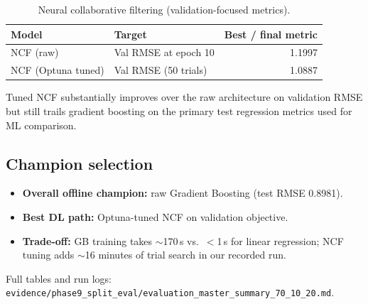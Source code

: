 \begin{table}[ht]
  \centering
  \caption{Neural collaborative filtering (validation-focused metrics).}
  \label{tab:dl}
  \begin{tabular}{llr}
    \toprule
    Model & Target & Best / final metric \\
    \midrule
    NCF (raw)         & Val RMSE at epoch 10 & 1.1997 \\
    NCF (Optuna tuned)& Val RMSE (50 trials)  & 1.0887 \\
    \bottomrule
  \end{tabular}
\end{table}

Tuned NCF substantially improves over the raw architecture on validation RMSE but still trails gradient
boosting on the primary test regression metrics used for ML comparison.

\subsection{Champion selection}

\begin{itemize}
  \item \textbf{Overall offline champion:} raw Gradient Boosting (test RMSE 0.8981).
  \item \textbf{Best DL path:} Optuna-tuned NCF on validation objective.
  \item \textbf{Trade-off:} GB training takes ${\sim}$170\,s vs.\ $<$1\,s for linear regression; NCF tuning
        adds ${\sim}$16 minutes of trial search in our recorded run.
\end{itemize}

Full tables and run logs: \texttt{evidence/phase9\_split\_eval/evaluation\_master\_summary\_70\_10\_20.md}.
